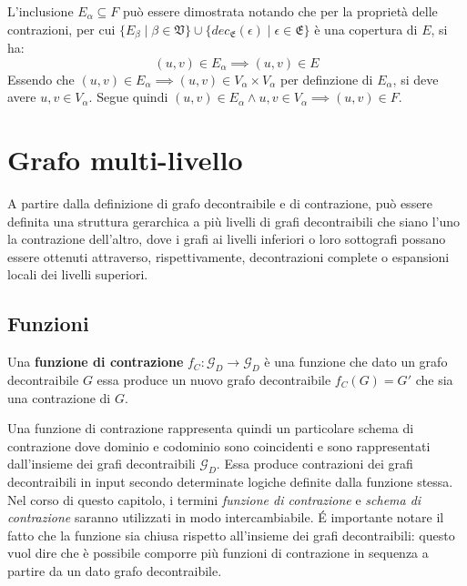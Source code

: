     L'inclusione $E_\alpha \subseteq F$ pu\`o essere dimostrata notando che per la propriet\`a delle contrazioni,
    per cui $\{ E_\beta \mid \beta \in \mathfrak{V}\} \cup
    \{dec_{\mathfrak{E}}(\epsilon) \mid \epsilon \in \mathfrak{E}\} $ \`e una copertura di $E$, si ha:
    \begin{equation*}
        (u, v) \in E_\alpha \implies (u, v) \in E
    \end{equation*}
    Essendo che  $(u, v) \in E_\alpha \implies (u, v) \in V_\alpha \times V_\alpha$ per definzione di $E_\alpha$, si
    deve avere $u, v \in V_\alpha$. Segue quindi $(u, v) \in E_\alpha \land u,v \in V_\alpha \implies (u, v) \in F$.

    \newpage

    \section{Grafo multi-livello}\label{sec:grafo-multi-livello}

    A partire dalla definizione di grafo decontraibile e di contrazione, pu\`o essere definita una struttura gerarchica
    a pi\`u livelli di grafi decontraibili che siano l'uno la contrazione dell'altro, dove i grafi ai livelli inferiori
    o loro sottografi possano essere ottenuti attraverso, rispettivamente, decontrazioni complete o espansioni locali
    dei livelli superiori.

    \subsection{Funzioni}\label{subsec:funzioni}

    \begin{definition} 
    Una \textbf{funzione di contrazione} $f_C : \mathcal{G}_D \rightarrow \mathcal{G}_D$ \`e una funzione che dato un
    grafo decontraibile $G$ essa produce un nuovo grafo decontraibile $f_C(G) = G'$ che sia una contrazione di $G$.
    \end{definition}

    Una funzione di contrazione rappresenta quindi un particolare schema di contrazione dove dominio e codominio sono
    coincidenti e sono rappresentati dall'insieme dei grafi decontraibili $\mathcal{G}_D$. Essa produce contrazioni
    dei grafi decontraibili in input secondo determinate logiche definite dalla funzione stessa.
    Nel corso di questo capitolo, i termini \textit{funzione di contrazione} e \textit{schema di contrazione}
    saranno utilizzati in modo intercambiabile. \newline
    \'E importante notare il fatto che la funzione sia chiusa rispetto all'insieme dei grafi decontraibili: questo vuol
    dire che \`e possibile comporre pi\`u funzioni di contrazione in sequenza a partire da un dato grafo decontraibile.
    \newline


